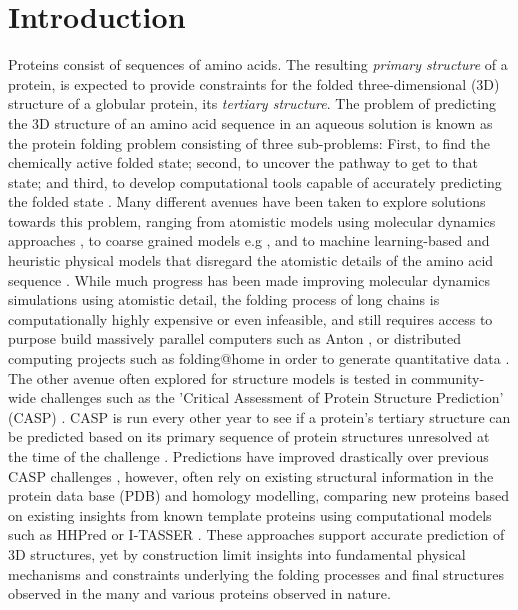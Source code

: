 \documentclass[9pt]{elife}
\begin{document}
\section{Introduction}
Proteins consist of sequences of amino acids. The resulting \textit{primary structure} of a protein, is expected to provide constraints for the folded three-dimensional (3D) structure of a globular protein, its \textit{tertiary structure}. The problem of predicting the 3D structure of an amino acid sequence in an aqueous solution is known as the protein folding problem consisting of three sub-problems: 
First, to find the chemically active folded state; second, to uncover the pathway to get to that state; and third, to develop computational tools capable of accurately predicting the folded state \cite{Dill1042,Scheraga2007,Mirny2001,Shakhnovich2006,Saunders2013,mey2014rare}. 
Many different avenues have been taken to explore solutions towards this problem, ranging from atomistic models using molecular dynamics approaches \cite{snow2002absolute}, to coarse grained models e.g \cite{CLEMENTI200810}, and to machine learning-based and heuristic physical models that disregard the atomistic details of the amino acid sequence \cite{doi:10.1093/bioinformatics/btl102,PRO:PRO5560040401}. While much progress has been made improving molecular dynamics simulations using atomistic detail, the folding process of long chains is computationally highly expensive or even infeasible, and still requires access to purpose build massively parallel computers such as Anton \cite{shaw2008anton}, or distributed computing projects such as folding@home in order to generate quantitative data \cite{shirts2000screen}. The other avenue often explored for structure models is tested in community-wide challenges such as the 'Critical Assessment of Protein Structure Prediction' (CASP) \cite{moult2007critical,moult2018critical,monastyrskyy2016new}. CASP is run every other year to see if a protein's tertiary structure can be predicted based on its primary sequence of protein structures unresolved at the time of the challenge \cite{doi:10.1002/prot.25452}. Predictions have improved drastically over previous CASP challenges \cite{Dill1042}, however, often rely on existing structural information in the protein data base (PDB) and homology modelling, comparing new proteins based on existing insights from known template proteins using computational models such as HHPred \cite{Bradley1868} or I-TASSER \cite{yang2015tasser}. These approaches support accurate prediction of 3D structures, yet by construction limit insights into fundamental physical mechanisms and constraints underlying the folding processes and final structures observed in the many and various proteins observed in nature.
\end{document}
